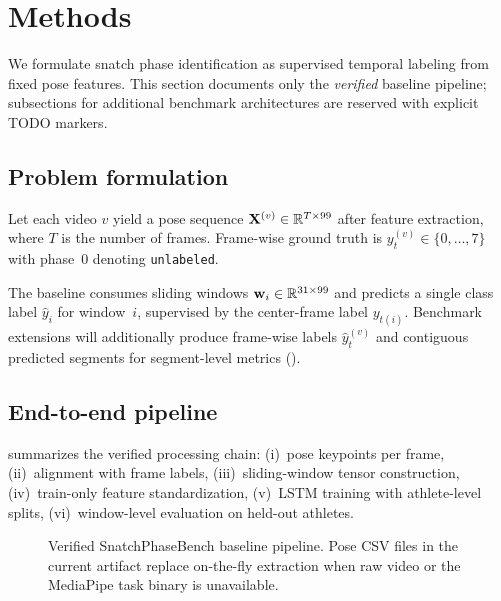 \section{Methods}
\label{sec:methods}

We formulate snatch phase identification as supervised temporal labeling from fixed pose features.
This section documents only the \emph{verified} baseline pipeline; subsections for additional benchmark architectures are reserved with explicit \textsc{TODO} markers.

\subsection{Problem formulation}
\label{sec:methods:problem}

Let each video $v$ yield a pose sequence $\mathbf{X}^{(v)} \in \mathbb{R}^{T \times 99}$ after feature extraction, where $T$ is the number of frames.
Frame-wise ground truth is $y^{(v)}_t \in \{0,\ldots,7\}$ with phase~0 denoting \texttt{unlabeled}.

The baseline consumes sliding windows $\mathbf{w}_i \in \mathbb{R}^{31 \times 99}$ and predicts a single class label $\hat{y}_i$ for window~$i$, supervised by the center-frame label $y_{t(i)}$.
Benchmark extensions will additionally produce frame-wise labels $\hat{y}^{(v)}_t$ and contiguous predicted segments for segment-level metrics ().

\subsection{End-to-end pipeline}
\label{sec:methods:pipeline}

 summarizes the verified processing chain:
(i)~pose keypoints per frame,
(ii)~alignment with frame labels,
(iii)~sliding-window tensor construction,
(iv)~train-only feature standardization,
(v)~\acs{LSTM} training with athlete-level splits,
(vi)~window-level evaluation on held-out athletes.

\begin{figure}[t]
  \centering
  \caption{Verified SnatchPhaseBench baseline pipeline. Pose CSV files in the current artifact replace on-the-fly extraction when raw video or the MediaPipe task binary is unavailable.}
  \label{fig:pipeline}
\end{figure}

